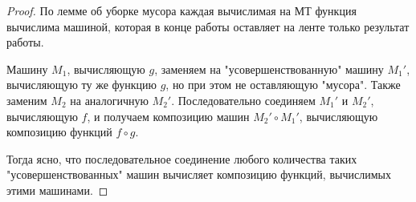 \documentclass[a4paper, 12pt]{article}
\begin{document}
\begin{proof}
    По лемме об уборке мусора каждая вычислимая на МТ функция вычислима машиной, которая в конце работы оставляет на ленте только результат работы.
    
    Машину $M_1$, вычисляющую $g$, заменяем на "усовершенствованную" машину $M_1'$, вычисляющую ту же функцию $g$, но при этом не оставляющую "мусора". Также заменим $M_2$ на аналогичную $M_2'$. Последовательно соединяем $M_1'$ и $M_2'$, вычисляющую $f$, и получаем композицию машин $M_2' \circ M_1'$, вычисляющую композицию функций $f \circ g$.
    
    Тогда ясно, что последовательное соединение любого количества таких "усовершенствованных" машин вычисляет композицию функций, вычислимых этими машинами.
    
\end{proof}
\end{document}
